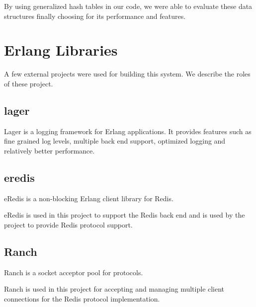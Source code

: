 By using generalized hash tables in our code, we were able to evaluate these
data structures finally choosing  for its performance and features.

\section{Erlang Libraries}

A few external projects were used for building this system. We describe the
roles of these project.

\subsection{lager}

Lager \citep{lager} is a logging framework for Erlang applications. It provides
features such as fine grained log levels, multiple back end support, optimized
logging and relatively better performance.

\subsection{eredis}

eRedis \citep{eredis} is a non-blocking Erlang client library for Redis.

eRedis is used in this project to support the Redis back end and is used by the
project to provide Redis protocol support.

\subsection{Ranch}

Ranch \citep{ranch} is a socket acceptor pool for  protocols.

Ranch is used in this project for accepting and managing multiple client
 connections for the Redis protocol implementation.

